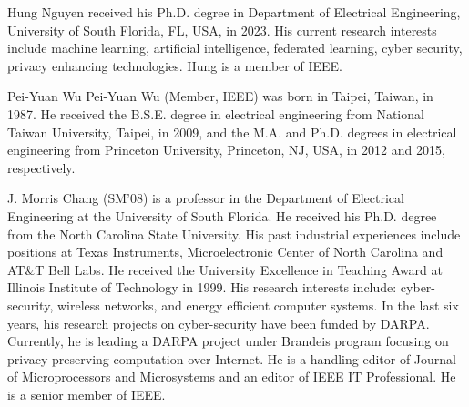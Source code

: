 \documentclass[journal]{IEEEtai}
\begin{document}




\begin{IEEEbiography}{Hung Nguyen}
	received his Ph.D. degree in Department of Electrical Engineering, University of South Florida, FL, USA, in 2023. His current research interests include machine learning, artificial intelligence, federated learning, cyber security, privacy enhancing technologies. Hung is a member of IEEE.
\end{IEEEbiography}

\begin{IEEEbiography}{Pei-Yuan Wu}
	Pei-Yuan Wu (Member, IEEE) was born in Taipei,
	Taiwan, in 1987. He received the B.S.E. degree
	in electrical engineering from National Taiwan
	University, Taipei, in 2009, and the M.A. and Ph.D.
	degrees in electrical engineering from Princeton
	University, Princeton, NJ, USA, in 2012 and 2015,
	respectively.
\end{IEEEbiography}

\begin{IEEEbiography}{J. Morris Chang}
	(SM'08) is a professor in the Department of Electrical Engineering at the University of South Florida. He received his Ph.D. degree from the North Carolina State University. His past industrial experiences include positions at Texas Instruments, Microelectronic Center of North Carolina and AT\&T Bell Labs. He received the University Excellence in Teaching Award at Illinois Institute of Technology in 1999. His research interests include: cyber-security, wireless networks, and energy efficient computer systems. In the last six years, his research projects on cyber-security have been funded by DARPA. Currently, he is leading a DARPA project under Brandeis program focusing on privacy-preserving computation over Internet. He is a handling editor of Journal of Microprocessors and Microsystems and an editor of IEEE IT Professional. He is a senior member of IEEE.
\end{IEEEbiography}

%
\end{document}
